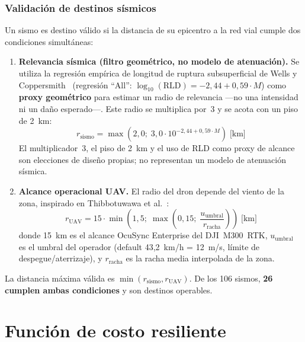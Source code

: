 \documentclass[conference]{IEEEtran}
\begin{document}
\subsubsection{Validación de destinos sísmicos}

Un sismo es destino válido si la distancia de su epicentro a la red vial cumple dos condiciones simultáneas:

\begin{enumerate}[label=\arabic*.,itemsep=2pt]
\item \textbf{Relevancia sísmica (filtro geométrico, no modelo de atenuación).} Se utiliza la regresión empírica de longitud de ruptura subsuperficial de Wells y Coppersmith~\cite{wells1994} (regresión ``All'': $\log_{10}(\text{RLD}) = -2{,}44 + 0{,}59 \cdot M$) como \textbf{proxy geométrico} para estimar un radio de relevancia ---no una intensidad ni un daño esperado---. Este radio se multiplica por~3 y se acota con un piso de 2~km:
\begin{equation}
r_{\text{sismo}} = \max\!\left(2{,}0;\; 3{,}0 \cdot 10^{-2{,}44 + 0{,}59 \cdot M}\right) \;\text{[km]}
\label{eq:radio_sismo}
\end{equation}
El multiplicador~3, el piso de 2~km y el uso de RLD como proxy de alcance son elecciones de diseño propias; no representan un modelo de atenuación sísmica.
\item \textbf{Alcance operacional UAV.} El radio del dron depende del viento de la zona, inspirado en Thibbotuwawa et al.~\cite{thibbotuwawa2020}:
\begin{equation}
r_{\text{UAV}} = 15 \cdot \min\!\left(1{,}5;\; \max\!\left(0{,}15;\; \frac{u_{\text{umbral}}}{r_{\text{racha}}}\right)\right) \;\text{[km]}
\label{eq:radio_uav}
\end{equation}
donde 15~km es el alcance OcuSync Enterprise del DJI~M300~RTK, $u_{\text{umbral}}$ es el umbral del operador (default 43,2~km/h = 12~m/s, límite de despegue/aterrizaje), y $r_{\text{racha}}$ es la racha media interpolada de la zona.
\end{enumerate}

La distancia máxima válida es $\min(r_{\text{sismo}}, r_{\text{UAV}})$. De los 106 sismos, \textbf{26 cumplen ambas condiciones} y son destinos operables.

\section{Función de costo resiliente}
\label{sec:costo}
\end{document}
